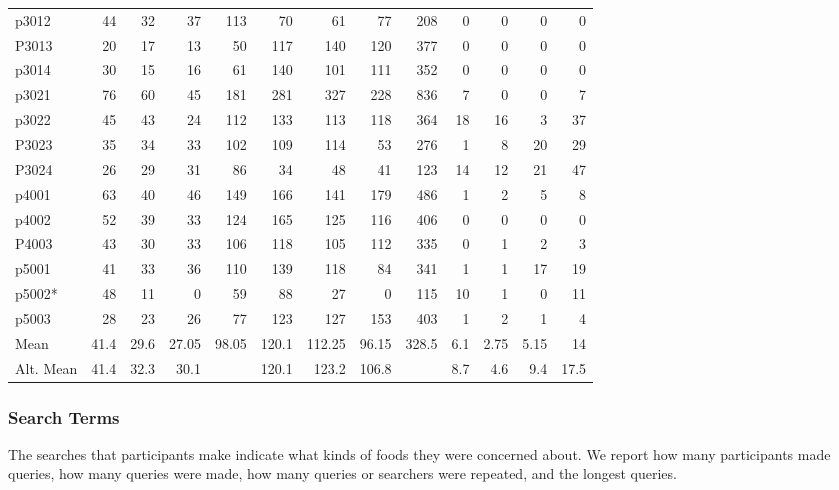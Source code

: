 \begin{table}[htbp]
\begin{tabular}{lrrrrrrrrrrrr}
    p3012 & 44    & 32    & 37    & 113   & 70    & 61    & 77    & 208   & 0     & 0     & 0     & 0 \\
    P3013 & 20    & 17    & 13    & 50    & 117   & 140   & 120   & 377   & 0     & 0     & 0     & 0 \\
    p3014 & 30    & 15    & 16    & 61    & 140   & 101   & 111   & 352   & 0     & 0     & 0     & 0 \\
    p3021 & 76    & 60    & 45    & 181   & 281   & 327   & 228   & 836   & 7     & 0     & 0     & 7 \\
    p3022 & 45    & 43    & 24    & 112   & 133   & 113   & 118   & 364   & 18    & 16    & 3     & 37 \\
    P3023 & 35    & 34    & 33    & 102   & 109   & 114   & 53    & 276   & 1     & 8     & 20    & 29 \\
    P3024 & 26    & 29    & 31    & 86    & 34    & 48    & 41    & 123   & 14    & 12    & 21    & 47 \\
    p4001 & 63    & 40    & 46    & 149   & 166   & 141   & 179   & 486   & 1     & 2     & 5     & 8 \\
    p4002 & 52    & 39    & 33    & 124   & 165   & 125   & 116   & 406   & 0     & 0     & 0     & 0 \\
    P4003 & 43    & 30    & 33    & 106   & 118   & 105   & 112   & 335   & 0     & 1     & 2     & 3 \\
    p5001 & 41    & 33    & 36    & 110   & 139   & 118   & 84    & 341   & 1     & 1     & 17    & 19 \\
    p5002* & 48    & 11    & 0     & 59    & 88    & 27    & 0     & 115   & 10    & 1     & 0     & 11 \\
    p5003 & 28    & 23    & 26    & 77    & 123   & 127   & 153   & 403   & 1     & 2     & 1     & 4 \\
\midrule
    Mean  & 41.4  & 29.6  & 27.05 & 98.05 & 120.1 & 112.25 & 96.15 & 328.5 & 6.1   & 2.75  & 5.15  & 14 \\
    Alt. Mean & 41.4  & 32.3  & 30.1  &       & 120.1 & 123.2 & 106.8 &       & 8.7   & 4.6   & 9.4   & 17.5 \\

    \bottomrule
    \end{tabular}%
  \label{tab:strategy_table}%
\end{table}%


\subsubsection{Search Terms}
The searches that participants make indicate what kinds of foods they were concerned about. We report how many participants made queries, how many queries were made, how many queries or searchers were repeated, and the longest queries. 

